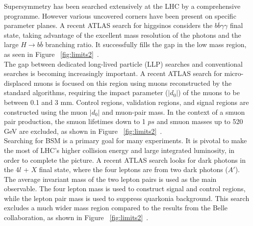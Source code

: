 \documentclass{moriond}
\begin{document}
Supersymmetry has been searched extensively at the LHC by a comprehensive
programme. However various uncovered corners have been present on specific
parameter planes. A recent ATLAS search for higgsinos considers the
$b\overline{b}\gamma\gamma$ final state, taking advantage of the excellent mass
resolution of the photons and the large $H\rightarrow b\overline{b}$ branching
ratio. It successfully fills the gap in the low mass region, as seen in Figure
~\ref{fig:limits2}~\cite{bbyy}.\\

The gap between dedicated long-lived particle (LLP) searches and conventional
searches is becoming increasingly important. A recent ATLAS search for
micro-displaced muons is focused on this region using muons reconstructed by the
standard algorithms, requiring the impact parameter ($|d_{0}|$) of the muons to
be between 0.1 and 3 mm. Control regions, validation regions, and signal
regions are constructed using the muon $|d_{0}|$ and muon-pair mass. In the
context of a smuon pair production, the smuon lifetimes down to 1 $ps$ and
smuon masses up to 520 GeV are excluded, as shown in Figure
~\ref{fig:limits2}~\cite{micro}.\\   

Searching for BSM is a primary goal for many experiments. It is pivotal to make
the most of LHC's higher collision energy and large integrated luminosity, in
order to complete the picture. A recent ATLAS search looks for dark photons in
the 4$l$ + $X$ final state, where the four leptons are from two dark photons
($A'$). The average invariant mass of the two lepton pairs is used as the main
observable. The four lepton mass is used to construct signal and control
regions, while the lepton pair mass is used to suppress quarkonia background.
This search excludes a much wider mass region compared to the results from the
Belle collaboration, as shown in Figure
~\ref{fig:limits2}~\cite{dark}.\\ 

\clearpage
\end{document}
